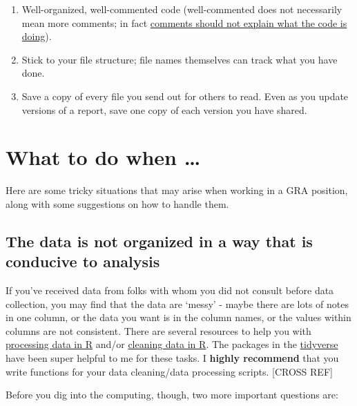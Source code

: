 \documentclass[
]{book}
\begin{document}
\begin{enumerate}
\def\labelenumi{\arabic{enumi}.}
\item
  Well-organized, well-commented code (well-commented does not necessarily mean more comments; in fact \href{https://visualstudiomagazine.com/articles/2013/07/26/why-commenting-code-is-still-bad.aspx}{comments should not explain what the code is doing}).
\item
  Stick to your file structure; file names themselves can track what you have done.
\item
  Save a copy of every file you send out for others to read. Even as you update versions of a report, save one copy of each version you have shared.
\end{enumerate}

\hypertarget{what-to-do-when}{%
\section{What to do when \ldots{}}\label{what-to-do-when}}

Here are some tricky situations that may arise when working in a GRA position, along with some suggestions on how to handle them.

\hypertarget{the-data-is-not-organized-in-a-way-that-is-conducive-to-analysis}{%
\subsection{The data is not organized in a way that is conducive to analysis}\label{the-data-is-not-organized-in-a-way-that-is-conducive-to-analysis}}

If you've received data from folks with whom you did not consult before data collection, you may find that the data are `messy' - maybe there are lots of notes in one column, or the data you want is in the column names, or the values within columns are not consistent. There are several resources to help you with \href{https://www.geeksforgeeks.org/processing-of-raw-data-to-tidy-data-in-r/}{processing data in R} and/or \href{https://www.geeksforgeeks.org/data-cleaning-in-r/}{cleaning data in R}. The packages in the \href{https://www.tidyverse.org/packages/}{tidyverse} have been super helpful to me for these tasks. I \textbf{highly recommend} that you write functions for your data cleaning/data processing scripts. {[}CROSS REF{]}

Before you dig into the computing, though, two more important questions are:
\end{document}
